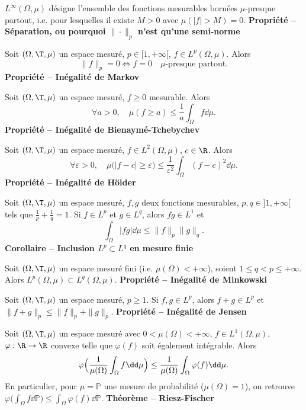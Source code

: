 $L^\infty(\Omega,\mu)$ désigne l’ensemble des fonctions mesurables bornées $\mu$-presque partout, i.e. pour lesquelles il existe $M>0$ avec $\mu(|f|>M)=0$.
\textbf{Propriété – Séparation, ou pourquoi $\|\cdot\|_p$ n’est qu’une semi-norme}

Soit $(\Omega,\T,\mu)$ un espace mesuré, $p\in[1,+\infty[$, $f\in L^p(\Omega,\mu)$. Alors
\[\|f\|_p=0\iff f=0\quad\mu\text{-presque partout}.\]
\textbf{Propriété – Inégalité de Markov}

Soit $(\Omega,\T,\mu)$ un espace mesuré, $f\ge0$ mesurable. Alors
\[\forall a>0,\quad\mu(f\ge a)\le\frac1a\int_\Omega f\dd\mu.\]
\textbf{Propriété – Inégalité de Bienaymé-Tchebychev}

Soit $(\Omega,\T,\mu)$ un espace mesuré, $f\in L^2(\Omega,\mu)$, $c\in\R$. Alors
\[\forall\varepsilon>0,\quad\mu\bigl(|f-c|\ge\varepsilon\bigr)\le\frac1{\varepsilon^2}\int_\Omega(f-c)^2\dd\mu.\]
\textbf{Propriété – Inégalité de Hölder}

Soit $(\Omega,\T,\mu)$ un espace mesuré, $f,g$ deux fonctions mesurables, $p,q\in]1,+\infty[$ tels que $\frac1p+\frac1q=1$. Si $f\in L^p$ et $g\in L^q$, alors $fg\in L^1$ et
\[\int_\Omega|fg|\dd\mu\le\|f\|_p\|g\|_q.\]
\textbf{Corollaire – Inclusion $L^p\subset L^q$ en mesure finie}

Soit $(\Omega,\T,\mu)$ un espace mesuré fini (i.e. $\mu(\Omega)<+\infty$), soient $1\le q<p\le+\infty$. Alors $L^p(\Omega,\mu)\subset L^q(\Omega,\mu)$.
\textbf{Propriété – Inégalité de Minkowski}

Soit $(\Omega,\T,\mu)$ un espace mesuré, $p\ge1$. Si $f,g\in L^p$, alors $f+g\in L^p$ et $\|f+g\|_p\le\|f\|_p+\|g\|_p$.
\textbf{Propriété – Inégalité de Jensen}

Soit $(\Omega,\T,\mu)$ un espace mesuré avec $0<\mu(\Omega)<+\infty$, $f\in L^1(\Omega,\mu)$, $\varphi:\R\to\R$ convexe telle que $\varphi(f)$ soit également intégrable. Alors
\[\varphi\Bigl(\frac1{\mu(\Omega)}\int_\Omega f\dd\mu\Bigr)\le\frac1{\mu(\Omega)}\int_\Omega\varphi(f)\dd\mu.\]
En particulier, pour $\mu=\mathbb P$ une mesure de probabilité ($\mu(\Omega)=1$), on retrouve $\varphi\bigl(\int_\Omega f\dd\mathbb P\bigr)\le\int_\Omega\varphi(f)\dd\mathbb P$.
\textbf{Théorème – Riesz-Fischer}

